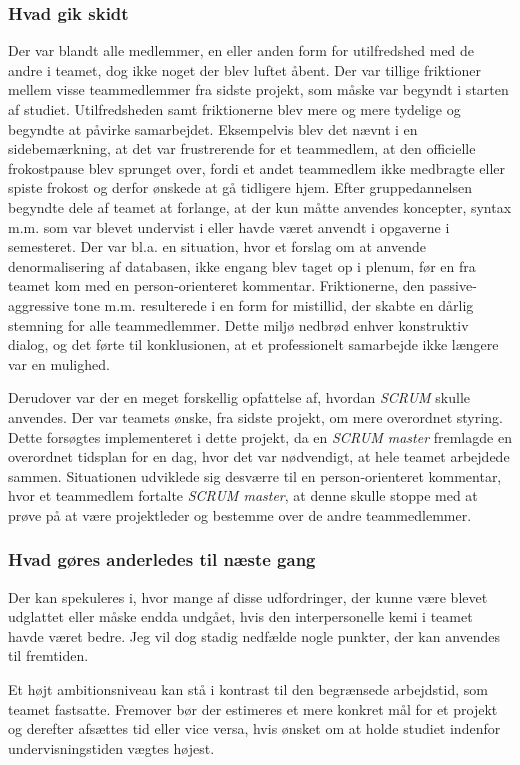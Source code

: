 \subsubsection{Hvad gik skidt}
Der var blandt alle medlemmer, en eller anden form for utilfredshed med de andre i teamet, dog ikke noget der blev luftet åbent. 
Der var tillige friktioner mellem visse teammedlemmer fra sidste projekt, som måske var begyndt i starten af studiet. Utilfredsheden samt friktionerne blev mere og mere tydelige og begyndte at påvirke samarbejdet. 
Eksempelvis blev det nævnt i en sidebemærkning, at det var frustrerende for et teammedlem, at den officielle frokostpause blev sprunget over, fordi et andet teammedlem ikke medbragte eller spiste frokost og derfor ønskede at gå tidligere hjem. 
Efter gruppedannelsen begyndte dele af teamet at forlange, at der kun måtte anvendes koncepter, syntax m.m. som var blevet undervist i eller havde været anvendt i opgaverne i semesteret. 
Der var bl.a. en situation, hvor et forslag om at anvende denormalisering af databasen, ikke engang blev taget op i plenum, før en fra teamet kom med en person-orienteret kommentar.
Friktionerne, den passive-aggressive tone m.m. resulterede i en form for mistillid, der skabte en dårlig stemning for alle teammedlemmer. 
Dette miljø nedbrød enhver konstruktiv dialog, og det førte til konklusionen, at et professionelt samarbejde ikke længere var en mulighed.

Derudover var der en meget forskellig opfattelse af, hvordan \emph{SCRUM} skulle anvendes. Der var teamets ønske, fra sidste projekt, om mere overordnet styring. Dette forsøgtes implementeret i dette projekt, da en \emph{SCRUM master} fremlagde en overordnet tidsplan for en dag, hvor det var nødvendigt, at hele teamet arbejdede sammen. 
Situationen udviklede sig desværre til en person-orienteret kommentar, hvor et teammedlem fortalte \emph{SCRUM master}, at denne skulle stoppe med at prøve på at være projektleder og bestemme over de andre teammedlemmer.

\subsubsection{Hvad gøres anderledes til næste gang}
Der kan spekuleres i, hvor mange af disse udfordringer, der kunne være blevet udglattet eller måske endda undgået, hvis den interpersonelle kemi i teamet havde været bedre. Jeg vil dog stadig nedfælde nogle punkter, der kan anvendes til fremtiden.

Et højt ambitionsniveau kan stå i kontrast til den begrænsede arbejdstid, som teamet fastsatte. Fremover bør der estimeres et mere konkret mål for et projekt og derefter afsættes tid eller vice versa, hvis ønsket om at holde studiet indenfor undervisningstiden vægtes højest.

